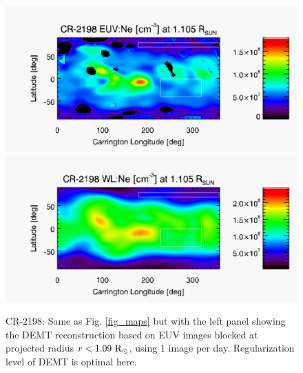 \begin{figure}[]
  \centering
  \includegraphics[width=\columnwidth]{map_Ne_CR2198_DEMT-AIA_H1-L799_r3D_reduced_1105_Rsun.pdf}
  \includegraphics[width=\columnwidth]{map_x_KCORCR219813imgs-reducedbf2ri105ro225_Inst_109_200_120_90_180_dropneg_r3D_l1e-4_1105_Rsun.pdf}
  \caption{CR-2198: Same as Fig. \ref{fig_maps} but with the left panel showing the DEMT reconstruction based on EUV images blocked at projected radius $r<1.09~\rm{R}_\odot$, using 1 image per day. Regularization level of DEMT is optimal here.}
  \label{fig_maps6}
\end{figure}


